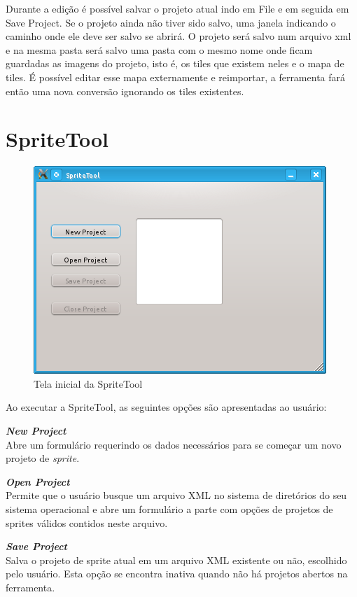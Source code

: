 \documentclass[brazil]{abnt}
\begin{document}
Durante a edição é possível salvar o projeto atual indo em File e em seguida em Save Project. Se o projeto ainda não tiver sido salvo, uma janela indicando o caminho onde ele deve ser salvo se abrirá. O projeto será salvo num arquivo xml e na mesma pasta será salvo uma pasta com o mesmo nome onde ficam guardadas as imagens do projeto, isto é, os tiles que existem neles e o mapa de tiles.
É possível editar esse mapa externamente e reimportar, a ferramenta fará então uma nova conversão ignorando os tiles existentes.

\section{SpriteTool}

\begin{figure}[H]
\centering
\includegraphics{imgs/spritetool4.png}
\caption{Tela inicial da SpriteTool}
\end{figure}

Ao executar a SpriteTool, as seguintes opções são apresentadas ao usuário:

\textbf{\textit{New Project}}\\
Abre um formulário requerindo os dados necessários para se começar um novo projeto de \textit{sprite}.

\textbf{\textit{Open Project}}\\
Permite que o usuário busque um arquivo XML no sistema de diretórios do seu sistema operacional e abre um formulário a parte com opções de projetos de sprites válidos contidos neste arquivo.

\textbf{\textit{Save Project}}\\
Salva o projeto de sprite atual em um arquivo XML existente ou não, escolhido pelo usuário. Esta opção se encontra inativa quando não há projetos abertos na ferramenta.
\end{document}
